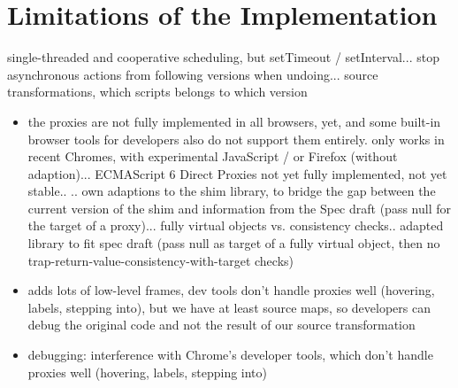\section{Limitations of the Implementation}






single-threaded and cooperative scheduling, but setTimeout / setInterval... stop asynchronous actions from following versions when undoing... source transformations, which scripts belongs to which version



\begin{itemize}
    \item  the proxies are not fully implemented in all browsers, yet, and some built-in browser tools for developers also do not support them entirely.
    only works in recent Chromes, with experimental JavaScript / or Firefox (without adaption)... ECMAScript 6 Direct Proxies not yet fully implemented, not yet stable..
.. own adaptions to the shim library, to bridge the gap between the current version of the shim and information from the Spec draft (pass null for the target of a proxy)... fully virtual objects vs. consistency checks.. adapted library to fit spec draft (pass null as target of a fully virtual object, then no trap-return-value-consistency-with-target checks)
\end{itemize}
    


\begin{itemize}
    \item adds lots of low-level frames, dev tools don’t handle proxies well (hovering, labels, stepping into), but we have at least source maps, so developers can debug the original code and not the result of our source transformation
    \item debugging: interference with Chrome's developer tools, which don’t handle proxies well (hovering, labels, stepping into)
\end{itemize}


